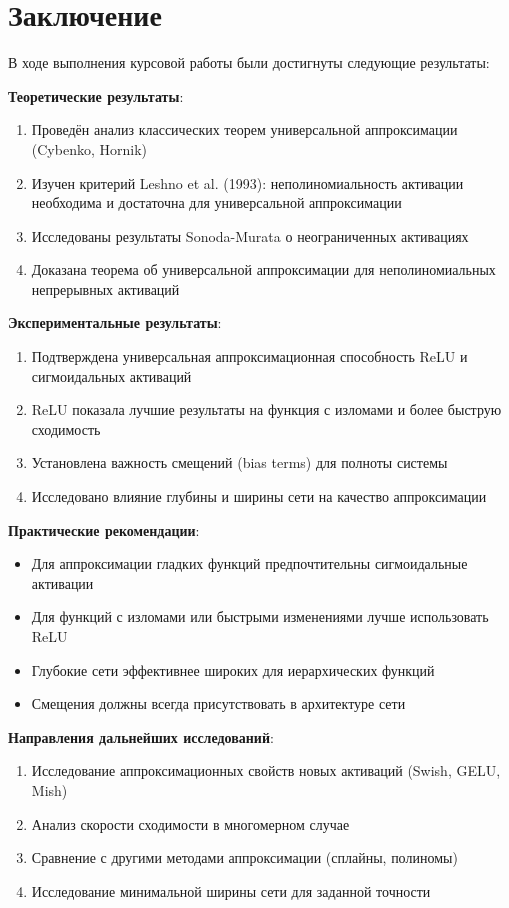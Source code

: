 \documentclass[12pt]{article}
\begin{document}
	\section*{Заключение}
	
	В ходе выполнения курсовой работы были достигнуты следующие результаты:
	
	\textbf{Теоретические результаты}:
	\begin{enumerate}
		\item Проведён анализ классических теорем универсальной аппроксимации (Cybenko, Hornik)
		\item Изучен критерий Leshno et al. (1993): неполиномиальность активации необходима и достаточна для универсальной аппроксимации
		\item Исследованы результаты Sonoda-Murata о неограниченных активациях
		\item Доказана теорема об универсальной аппроксимации для неполиномиальных непрерывных активаций
	\end{enumerate}
	
	\textbf{Экспериментальные результаты}:
	\begin{enumerate}
		\item Подтверждена универсальная аппроксимационная способность ReLU и сигмоидальных активаций
		\item ReLU показала лучшие результаты на функция с изломами и более быструю сходимость
		\item Установлена важность смещений (bias terms) для полноты системы
		\item Исследовано влияние глубины и ширины сети на качество аппроксимации
	\end{enumerate}
	
	\textbf{Практические рекомендации}:
	\begin{itemize}
		\item Для аппроксимации гладких функций предпочтительны сигмоидальные активации
		\item Для функций с изломами или быстрыми изменениями лучше использовать ReLU
		\item Глубокие сети эффективнее широких для иерархических функций
		\item Смещения должны всегда присутствовать в архитектуре сети
	\end{itemize}
	
	\textbf{Направления дальнейших исследований}:
	\begin{enumerate}
		\item Исследование аппроксимационных свойств новых активаций (Swish, GELU, Mish)
		\item Анализ скорости сходимости в многомерном случае
		\item Сравнение с другими методами аппроксимации (сплайны, полиномы)
		\item Исследование минимальной ширины сети для заданной точности
	\end{enumerate}
	
\end{document}
